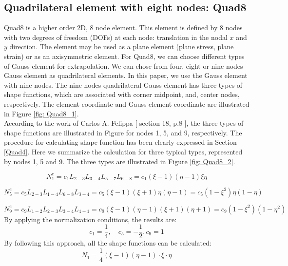 \subsection{Quadrilateral element with eight nodes: Quad8}
Quad8 is a higher order 2D, 8 node element. This element is defined by 8 nodes with two degrees of freedom (DOFs) at each node: translation in the nodal $x$ and $y$ direction. The element may be used as a plane element (plane stress, plane strain) or as an axisymmetric element. For Quad8, we can choose different types of Gauss element for extrapolation. We can chose from four, eight or nine nodes Gauss element as quadrilateral elements. In this paper, we use the Gauss element with nine nodes. The nine-nodes quadrilateral Gauss element has three types of shape functions, which are associated with corner midpoint, and, center nodes, respectively. The element coordinate and Gauss element coordinate are illustrated in Figure \ref{fig: Quad8_1}. \\
According to the work of Carlos A. Felippa [\cite{Felippa} section 18, p.8 ], the three types of shape functions are illustrated in Figure for nodes 1, 5, and 9, respectively. The procedure for calculating shape function has been clearly expressed in Section \ref{Quad4}. Here we summarize the calculation for three typical types, represented by nodes 1, 5 and 9. The three types are illustrated in Figure \ref{fig: Quad8_2}.

\begin{equation} \label{eq: Quad8_1}
N_1^e = c_1 L_{2-3}L_{3-4}L_{5-7} L_{6-8} = c_1 \left(\xi - 1\right) \left(\eta -1\right) \xi \eta
\end{equation}

\begin{equation} \label{eq: Quad8_2}
N_5^e = c_5L_{2-3} L_{1-4} L_{6-8} L_{3-4} = c_5 \left(\xi -1 \right) \left( \xi +1\right) \eta \left( \eta -1\right) = c_5 \left(1-\xi^2\right) \eta \left(1 - \eta\right)
\end{equation}

\begin{equation} \label{eq: Quad8_3}
N_9^e = c_9L_{1-2} L_{2-3} L_{3-4} L_{4-1} = c_9 \left(\xi -1 \right) \left( \eta - 1\right) \left(\xi + 1\right) \left( \eta + 1\right) = c_9 \left(1-\xi^2\right) \left(1 - \eta^2\right)
\end{equation}
By applying the normalization conditions, the results are:
\begin{equation*}
c_1 = \frac{1}{4}, \quad c_5 = -\frac{1}{2}, c_9 = 1
\end{equation*}
By following this approach, all the shape functions can be calculated:
\begin{equation}
N_1 = \frac{1}{4} \left(\xi - 1\right) \left( \eta -1 \right) \cdot\xi \cdot\eta
\end{equation}

